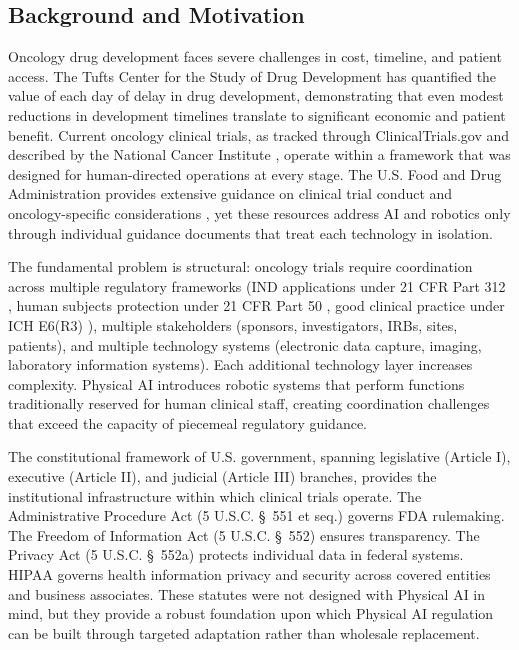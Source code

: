 
\subsection{Background and Motivation}
\label{subsec:background}

Oncology drug development faces severe challenges in cost, timeline, and
patient access. The Tufts Center for the Study of Drug Development
\cite{tufts-delay} has quantified the value of each day of delay in drug
development, demonstrating that even modest reductions in development
timelines translate to significant economic and patient benefit. Current
oncology clinical trials, as tracked through ClinicalTrials.gov
\cite{clinicaltrials-gov} and described by the National Cancer Institute
\cite{nci-clinical-trials}, operate within a framework that was designed for
human-directed operations at every stage. The U.S. Food and Drug
Administration provides extensive guidance on clinical trial conduct
\cite{fda-clinical-trials-guidance} and oncology-specific considerations
\cite{fda-oncology-guidance}, yet these resources address AI and robotics
only through individual guidance documents that treat each technology in
isolation.

The fundamental problem is structural: oncology trials require coordination
across multiple regulatory frameworks (IND applications under 21 CFR Part 312
\cite{cfr-part-312}, human subjects protection under 21 CFR Part 50
\cite{cfr-part-50}, good clinical practice under ICH E6(R3) \cite{ich-e6r3}),
multiple stakeholders (sponsors, investigators, IRBs, sites, patients), and
multiple technology systems (electronic data capture, imaging, laboratory
information systems). Each additional technology layer increases complexity.
Physical AI introduces robotic systems that perform functions traditionally
reserved for human clinical staff, creating coordination challenges that exceed
the capacity of piecemeal regulatory guidance.

The constitutional framework of U.S. government, spanning legislative (Article
I), executive (Article II), and judicial (Article III) branches, provides the
institutional infrastructure within which clinical trials operate. The
Administrative Procedure Act (5 U.S.C. \S~551 et seq.) governs FDA rulemaking.
The Freedom of Information Act (5 U.S.C. \S~552) ensures transparency. The
Privacy Act (5 U.S.C. \S~552a) protects individual data in federal systems.
HIPAA \cite{hipaa} governs health information privacy and security across
covered entities and business associates. These statutes were not designed
with Physical AI in mind, but they provide a robust foundation upon which
Physical AI regulation can be built through targeted adaptation rather than
wholesale replacement.


